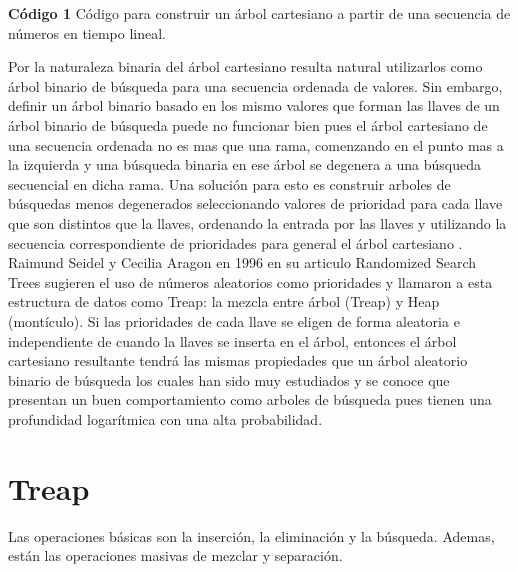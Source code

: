 \documentclass[12pt]{article}
\newcommand{\nl}{\vspace{0.3cm}}
\newcommand{\ct}{árbol cartesiano }
\begin{document}
\nl

\textbf{Código 1} Código para construir un \ct a partir de una secuencia de números en tiempo lineal.



Por la naturaleza binaria del \ct resulta natural utilizarlos como árbol binario de búsqueda para una secuencia ordenada de valores. Sin embargo, definir un árbol binario basado en los mismo valores que forman las llaves de un árbol binario de búsqueda puede no funcionar bien pues el \ct de una secuencia ordenada no es mas que una rama, comenzando en el punto mas a la izquierda y una búsqueda binaria en ese árbol se degenera a una búsqueda secuencial en dicha rama. Una solución para esto es construir arboles de búsquedas menos degenerados seleccionando valores de prioridad para cada llave que son distintos que la llaves, ordenando la entrada por las llaves y utilizando la secuencia correspondiente de prioridades para general el \ct.\\

Raimund Seidel y Cecilia Aragon en 1996 en su articulo Randomized Search Trees sugieren el uso de números aleatorios como prioridades y llamaron a esta estructura de datos como Treap: la mezcla entre árbol (Treap) y Heap (montículo). Si las prioridades de cada llave se eligen de forma aleatoria e independiente de cuando la llaves se inserta en el árbol, entonces el \ct resultante tendrá las mismas propiedades que un árbol aleatorio binario de búsqueda los cuales han sido muy estudiados y se conoce que presentan un buen comportamiento como arboles de búsqueda pues tienen una profundidad logarítmica con una alta probabilidad.

\section{Treap}

Las operaciones básicas son la inserción, la eliminación y la búsqueda. Ademas, están las operaciones masivas de mezclar y separación.
\end{document}
